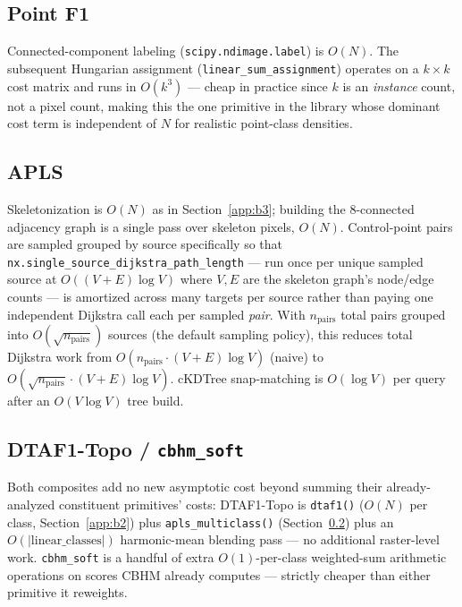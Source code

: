 \subsection{Point F1}
\label{app:b5}
Connected-component labeling (\texttt{scipy.ndimage.label}) is $O(N)$. The subsequent Hungarian
assignment (\texttt{linear\_sum\_assignment}) operates on a $k\times k$ cost matrix and runs in
$O(k^3)$ --- cheap in practice since $k$ is an \emph{instance} count, not a pixel count, making
this the one primitive in the library whose dominant cost term is independent of $N$ for
realistic point-class densities.

\subsection{APLS}
\label{app:b6}
Skeletonization is $O(N)$ as in Section~\ref{app:b3}; building the 8-connected adjacency graph is
a single pass over skeleton pixels, $O(N)$. Control-point pairs are sampled grouped by source
specifically so that \texttt{nx.single\_source\_dijkstra\_path\_length} --- run once per unique
sampled source at $O((V+E)\log V)$ where $V,E$ are the skeleton graph's node/edge counts --- is
amortized across many targets per source rather than paying one independent Dijkstra call each per
sampled \emph{pair}. With $n_{\mathrm{pairs}}$ total pairs grouped into $O(\sqrt{n_{\mathrm{pairs}}})$
sources (the default sampling policy), this reduces total Dijkstra work from
$O(n_{\mathrm{pairs}} \cdot (V+E)\log V)$ (naive) to $O(\sqrt{n_{\mathrm{pairs}}} \cdot (V+E)\log V)$.
cKDTree snap-matching is $O(\log V)$ per query after an $O(V\log V)$ tree build.

\subsection{DTAF1-Topo / \texttt{cbhm\_soft}}
\label{app:b7}
Both composites add no new asymptotic cost beyond summing their already-analyzed constituent
primitives' costs: DTAF1-Topo is \texttt{dtaf1()} ($O(N)$ per class, Section~\ref{app:b2}) plus
\texttt{apls\_multiclass()} (Section~\ref{app:b6}) plus an $O(|\mathrm{linear\_classes}|)$
harmonic-mean blending pass --- no additional raster-level work. \texttt{cbhm\_soft} is a handful
of extra $O(1)$-per-class weighted-sum arithmetic operations on scores CBHM already computes ---
strictly cheaper than either primitive it reweights.

